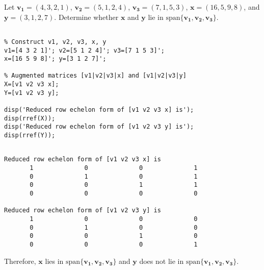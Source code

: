 \vspace{3mm}


\begin{exer} Let $\mathbf{v_{1}}=(4, 3, 2, 1)$, $\mathbf{v_{2}}=(5, 1, 2, 4)$, $\mathbf{v_{3}}=(7, 1, 5, 3)$, $\mathbf{x}=(16, 5, 9, 8)$, and $\mathbf{y}=(3, 1, 2, 7)$. Determine whether $\mathbf{x}$ and $\mathbf{y}$ lie in $\textrm{span}\{\mathbf{v_{1}}, \mathbf{v_{2}}, \mathbf{v_{3}}\}$.

\end{exer}


\begin{sol}

\begin{verbatim}

% Construct v1, v2, v3, x, y
v1=[4 3 2 1]'; v2=[5 1 2 4]'; v3=[7 1 5 3]';
x=[16 5 9 8]'; y=[3 1 2 7]';

% Augmented matrices [v1|v2|v3|x] and [v1|v2|v3|y]
X=[v1 v2 v3 x];
Y=[v1 v2 v3 y];

disp('Reduced row echelon form of [v1 v2 v3 x] is');
disp(rref(X));
disp('Reduced row echelon form of [v1 v2 v3 y] is');
disp(rref(Y));
\end{verbatim}


\begin{outputs}

\begin{verbatim}

Reduced row echelon form of [v1 v2 v3 x] is
       1              0              0              1       
       0              1              0              1       
       0              0              1              1       
       0              0              0              0       

Reduced row echelon form of [v1 v2 v3 y] is
       1              0              0              0       
       0              1              0              0       
       0              0              1              0       
       0              0              0              1      
\end{verbatim}
\end{outputs}

\noindent Therefore, $\mathbf{x}$ lies in $\textrm{span}\{\mathbf{v_{1}}, \mathbf{v_{2}}, \mathbf{v_{3}}\}$ and $\mathbf{y}$ does not lie in $\textrm{span}\{\mathbf{v_{1}}, \mathbf{v_{2}}, \mathbf{v_{3}}\}$. 
\end{sol}


